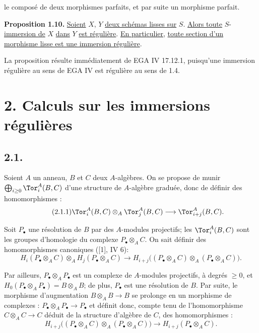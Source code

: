 
le composé de deux morphismes parfaits, et par suite un morphisme parfait.

\textbf{Proposition 1.10.} \uline{Soient} \(X\), \(Y\) \uline{deux schémas lisses sur} \(S\). \uline{Alors toute} \(S\)-\uline{immersion de} \(X\) \uline{dans} \(Y\) \uline{est régulière}. \uline{En particulier}, \uline{toute section d'un morphisme lisse est une immersion régulière}.

La proposition résulte immédiatement de EGA IV 17.12.1, puisqu'une immersion régulière au sens de EGA IV est régulière au sens de 1.4.

\section*{2. Calculs sur les immersions régulières}

\subsection*{2.1.}
Soient \(A\) un anneau, \(B\) et \(C\) deux \(A\)-algèbres. On se propose de munir \(\bigoplus_{i\ge0}\Tor_i^A(B,C)\) d'une structure de \(A\)-algèbre graduée, donc de définir des homomorphismes :
\begin{equation}\tag{2.1.1}
 \Tor_i^A(B,C)\otimes_A\Tor_j^A(B,C)\longrightarrow \Tor_{i+j}^A(B,C).
\end{equation}

Soit \(P_\bullet\) une résolution de \(B\) par des \(A\)-modules projectifs; les \(\Tor_i^A(B,C)\) sont les groupes d'homologie du complexe \(P_\bullet\otimes_A C\). On sait définir des homomorphismes canoniques ([1], IV 6):
\begin{equation}\tag{2.1.2}
 H_i(P_\bullet\otimes_A C)\otimes_A H_j(P_\bullet\otimes_A C)
 \longrightarrow H_{i+j}\bigl((P_\bullet\otimes_A C)\otimes_A(P_\bullet\otimes_A C)\bigr).
\end{equation}

Par ailleurs, \(P_\bullet\otimes_A P_\bullet\) est un complexe de \(A\)-modules projectifs, à degrés \(\geq0\), et \(H_0(P_\bullet\otimes_A P_\bullet)=B\otimes_A B\); de plus, \(P_\bullet\) est une résolution de \(B\). Par suite, le morphisme d'augmentation \(B\otimes_A B\to B\) se prolonge en un morphisme de complexes : \(P_\bullet\otimes_A P_\bullet\to P_\bullet\) et définit donc, compte tenu de l'homomorphisme \(C\otimes_A C\to C\) déduit de la structure d'algèbre de \(C\), des homomorphismes :
\begin{equation}\tag{2.1.3}
 H_{i+j}\bigl((P_\bullet\otimes_A C)\otimes_A(P_\bullet\otimes_A C)\bigr)
 \longrightarrow H_{i+j}(P_\bullet\otimes_A C).
\end{equation}
